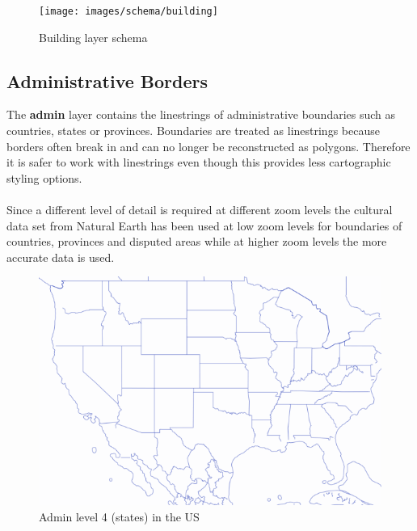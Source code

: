 \begin{figure}[H]
  \centering
  \texttt{[image: images/schema/building]}
  \caption{Building layer schema}
\end{figure}

\subsection{Administrative Borders}

\noindent\begin{minipage}[t]{0.48\linewidth}
    \vspace{0pt}
    The \textbf{admin} layer contains the linestrings of administrative boundaries such as countries, states or provinces.
    Boundaries are treated as linestrings because borders often break in \osm{} and can no longer be reconstructed as polygons. Therefore it is safer to work with linestrings even though this provides less cartographic styling options.
    \\\\
    Since a different level of detail is required at different zoom levels the cultural data set from  Natural Earth \cite{16_naturalearthdata.com_2015} has been used at low zoom levels for boundaries of countries, provinces and disputed areas while at higher zoom levels the more accurate \osm{} data is used.
\end{minipage}
\hfill
\begin{minipage}[t]{0.48\linewidth}
    \vspace{-20pt}
    \begin{figure}[H]
      \includegraphics[width=1\textwidth]{images/schema/admin_example}
      \caption{Admin level 4 (states) in the US}
    \end{figure}
\end{minipage}

